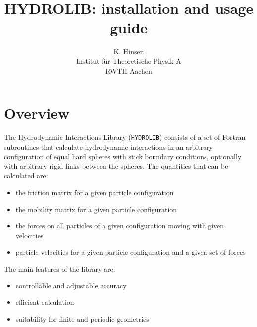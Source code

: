 
\oddsidemargin 0pt
\evensidemargin 0pt
\textwidth 16.2cm

\newcommand{\vect}[1]{{\bf #1}}
\newcommand{\tens}[1]{{\bf #1}}
\newcommand{\gvect}[1]{\mbox{\boldmath $#1$}}
\newcommand{\gtens}[1]{\mbox{\boldmath $#1$}}
\newcommand{\ti}[2]{\tens{#1}^{#2}}
\newcommand{\gti}[2]{\gtens{#1}^{#2}}
\newcommand{\vr}{\vect{r}}
\newcommand{\vR}{\vect{R}}
\newcommand{\vE}{\vect{E}}
\newcommand{\vv}{\vect{v}}
\newcommand{\vF}{\vect{F}}
\newcommand{\vU}{\vect{U}}
\newcommand{\tzeta}{\gtens{\zeta}}
\newcommand{\tmu}{\gtens{\mu}}
\newcommand{\prog}[1]{{\tt #1}}
\newcommand{\name}[1]{{\sc #1}}
\newcommand{\btitle}[1]{{#1,}}
\newcommand{\vol}[1]{{\bf #1}}

\newcommand{\wsp}{\hspace*{0.5cm}}



\title{HYDROLIB: installation and usage guide}
\author{K. Hinsen\\
        Institut f\"ur Theoretische Physik A\\
        RWTH Aachen}
\date{}
\maketitle
\tableofcontents
\newpage

\section{Overview}

The Hydrodynamic Interactions Library (\prog{HYDROLIB}) consists of a
set of Fortran subroutines that calculate hydrodynamic interactions in
an arbitrary configuration of equal hard spheres with stick boundary
conditions, optionally with arbitrary rigid links between the
spheres. The quantities that can be calculated are:
\begin{itemize}
\item the friction matrix for a given particle configuration
\item the mobility matrix for a given particle configuration
\item the forces on all particles of a given configuration moving
with given velocities
\item particle velocities for a given particle configuration and a given set
of forces
\end{itemize}
The main features of the library are:
\begin{itemize}
\item controllable and adjustable accuracy
\item efficient calculation
\item suitability for finite and periodic geometries
\end{itemize}


